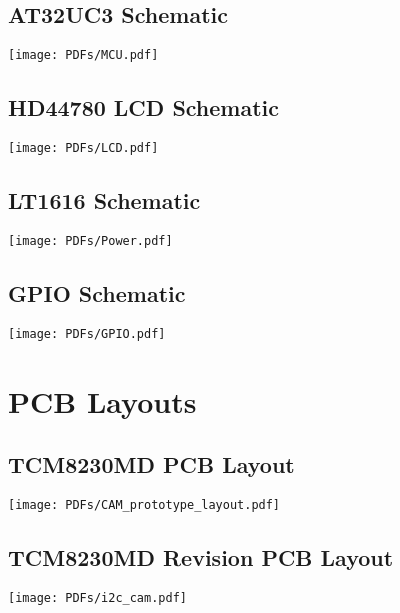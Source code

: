 \documentclass[11pt, a4paper, oneside]{Thesis} %
\begin{document}
\section{AT32UC3 Schematic}
\begin{center}
\texttt{[image: PDFs/MCU.pdf]}
\end{center}

\section{HD44780 LCD Schematic}
\begin{center}
\texttt{[image: PDFs/LCD.pdf]}
\end{center}

\section{LT1616 Schematic}
\begin{center}
\texttt{[image: PDFs/Power.pdf]}
\end{center}

\section{GPIO Schematic}
\begin{center}
\texttt{[image: PDFs/GPIO.pdf]}
\end{center}



\chapter{PCB Layouts} %
\label{AppendixB} %

\section{TCM8230MD PCB Layout}
\begin{center}
\texttt{[image: PDFs/CAM\_prototype\_layout.pdf]}
\end{center}

\section{TCM8230MD Revision PCB Layout}
\begin{center}
\texttt{[image: PDFs/i2c\_cam.pdf]}
\end{center}
\end{document}
